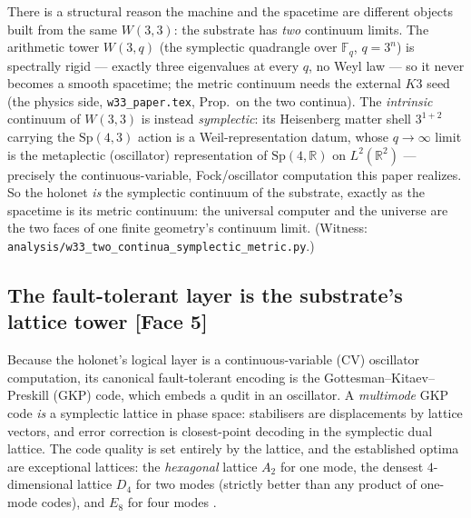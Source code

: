 \documentclass[11pt]{article}
\begin{document}
There is a structural reason the machine and the spacetime are different objects
built from the same $W(3,3)$: the substrate has \emph{two} continuum limits. The
arithmetic tower $W(3,q)$ (the symplectic quadrangle over $\mathbb F_{q}$,
$q=3^n$) is spectrally rigid --- exactly three eigenvalues at every $q$, no Weyl
law --- so it never becomes a smooth spacetime; the metric continuum needs the
external $K3$ seed (the physics side, \texttt{w33\_paper.tex}, Prop.\ on the two
continua). The \emph{intrinsic} continuum of $W(3,3)$ is instead
\emph{symplectic}: its Heisenberg matter shell $3^{1+2}$ carrying the
$\mathrm{Sp}(4,3)$ action is a Weil-representation datum, whose $q\to\infty$
limit is the metaplectic (oscillator) representation of
$\mathrm{Sp}(4,\mathbb R)$ on $L^2(\mathbb R^2)$ --- precisely the
continuous-variable, Fock/oscillator computation this paper realizes. So the
holonet \emph{is} the symplectic continuum of the substrate, exactly as the
spacetime is its metric continuum: the universal computer and the universe are
the two faces of one finite geometry's continuum limit. (Witness:
\texttt{analysis/w33\_two\_continua\_symplectic\_metric.py}.)

\subsection{The fault-tolerant layer is the substrate's lattice tower \texorpdfstring{\normalfont\small[Face 5]}{[Face 5]}}

Because the holonet's logical layer is a continuous-variable (CV) oscillator
computation, its canonical fault-tolerant encoding is the
Gottesman--Kitaev--Preskill (GKP) code, which embeds a qudit in an oscillator.
A \emph{multimode} GKP code \emph{is} a symplectic lattice in phase space:
stabilisers are displacements by lattice vectors, and error correction is
closest-point decoding in the symplectic dual lattice. The code quality is set
entirely by the lattice, and the established optima are exceptional lattices:
the \emph{hexagonal} lattice $A_2$ for one mode, the densest $4$-dimensional
lattice $D_4$ for two modes (strictly better than any product of one-mode
codes), and $E_8$ for four modes
\cite{conrad-gkp-lattice,lin-gkp-decoding}.
\end{document}
